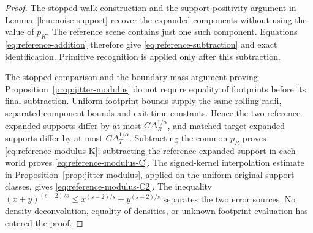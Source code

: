 \begin{proof}
The stopped-walk construction and the support-positivity argument in
Lemma~\ref{lem:noise-support} recover the expanded components without
using the value of $p_K$. The reference scene contains just one such
component. Equations \eqref{eq:reference-addition} therefore give
\eqref{eq:reference-subtraction} and exact identification. Primitive
recognition is applied only after this subtraction.

The stopped comparison and the boundary-mass argument proving
Proposition~\ref{prop:jitter-modulus} do not require equality of
footprints before its final subtraction. Uniform footprint bounds
supply the same rolling radii, separated-component bounds and exit-time
constants. Hence the two reference expanded supports differ by at most
$C\Delta_R^{1/\alpha}$, and matched target expanded supports differ
by at most $C\Delta_T^{1/\alpha}$. Subtracting the common $p_R$
proves \eqref{eq:reference-modulus-K}; subtracting the reference
expanded support in each world proves \eqref{eq:reference-modulus-C}.
The signed-kernel interpolation estimate in
Proposition~\ref{prop:jitter-modulus}, applied on the uniform original
support classes, gives \eqref{eq:reference-modulus-C2}. The inequality
$(x+y)^{(s-2)/s}\le x^{(s-2)/s}+y^{(s-2)/s}$ separates the two
error sources. No density deconvolution, equality of densities, or
unknown footprint evaluation has entered the proof.
\end{proof}

